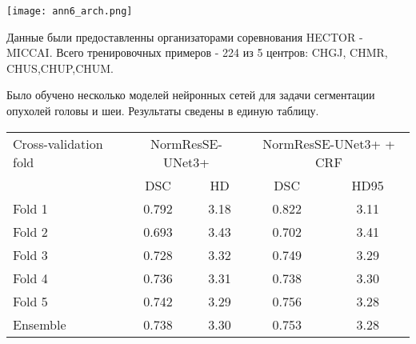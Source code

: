 \begin{minipage}{1.0\linewidth}
    \begin{center} 
    \texttt{[image: ann6\_arch.png]}\\
    
    \end{center}

\end{minipage}


Данные были предоставленны организаторами соревнования HECTOR - MICCAI. Всего 
тренировочных примеров - 224 из 5 центров: CHGJ, CHMR, CHUS,CHUP,CHUM.
\par
Было обучено несколько моделей нейронных сетей для задачи сегментации опухолей головы и шеи. 
Результаты сведены в единую таблицу.



{\small
{}
\begin{tabular}{|l| c| c| c| c|}
    \hline

     Cross-validation fold & \multicolumn{2}{|c|}{NormResSE-UNet3+} & \multicolumn{2}{|c|}{NormResSE-UNet3+ + CRF} \\
    \cline{1-5}
      & DSC & HD &  DSC & HD95 \\

    \hline
    Fold 1 & 0.792 & 3.18 & 0.822 & 3.11\\ \cline{2-5}
    \hline

    Fold 2 & 0.693 & 3.43 & 0.702 & 3.41\\ \cline{2-5}
    \hline
    Fold 3 & 0.728 & 3.32 & 0.749 & 3.29\\ \cline{2-5}
    \hline
    Fold 4 & 0.736 & 3.31 & 0.738 & 3.30\\ \cline{2-5}
    \hline
    Fold 5 & 0.742 & 3.29 & 0.756 & 3.28\\ \cline{2-5}
    \hline
    Ensemble & 0.738 & 3.30 & 0.753 & 3.28\\  \cline{2-5}
    \hline
 
    \hline \hline
    \end{tabular}
}
\\





